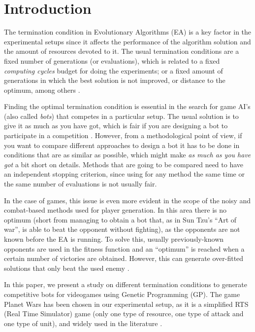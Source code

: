 \documentclass[runningheads,a4paper]{llncs}
\begin{document}
\section{Introduction}

The termination condition in Evolutionary Algorithms (EA) is a key
factor in the experimental setups since it affects the performance of
the algorithm solution and the amount of resources devoted to it. The
usual termination conditions are a fixed number of generations (or
evaluations), which is related to a fixed {\em computing cycles}
budget for doing the experiments; or a fixed amount of generations in
which the best solution is not improved, or distance to the optimum,
among others \cite{RocheTermination13}.

Finding the optimal termination condition is essential in the search for
game AI's (also called \textit{bots}) that competes in a particular setup. The usual solution is to give
it as much as you have got, which is fair if you are designing a bot %
to participate in a competition \cite{FernandezRTS11}. However, from a methodological point
of view, if you want to compare different approaches to design a bot
it has to be done in conditions that are as similar as possible, which
might make {\em as much as you have got} a bit short on
details. Methods that are going to be compared need to have an
independent stopping criterion, since using for any method the same
time or the same number of evaluations is not usually fair. 
 
In the case of games, this issue is even more evident in the scope of
the noisy and combat-based methods used for player generation. In this
area there is no optimum (short from managing to obtain a bot that, as
in Sun Tzu's ``Art of war'', is able to beat the opponent without
fighting), as the opponents are not known before the EA is running. To
solve this, usually previously-known opponents are used in the fitness
function and an ``optimum'' is reached when a certain number of
victories are obtained. However, this can generate over-fitted
solutions that only beat the used enemy \cite{MoraNoisy12}. %


In this paper, we present a study on different termination conditions to 
generate competitive bots for videogames using Genetic Programming (GP). The game Planet Wars has been chosen in 
our experimental setup, as it is a simplified RTS (Real Time Simulator) 
game (only one type of resource, one type of attack and one type
of unit), and widely used in the literature \cite{MoraNoisy12,FernandezRTS11}. 
\end{document}
